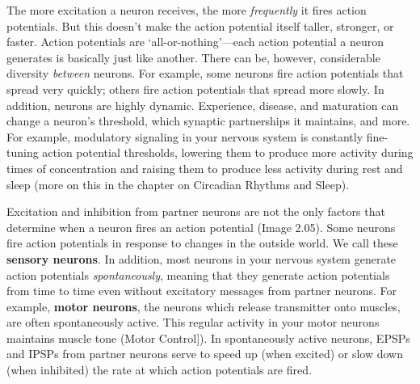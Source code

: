 \documentclass[
]{book}
\begin{document}
The more excitation a neuron receives, the more \emph{frequently} it fires action potentials. But this doesn't make the action potential itself taller, stronger, or faster. Action potentials are `all-or-nothing'---each action potential a neuron generates is basically just like another. There can be, however, considerable diversity \emph{between} neurons. For example, some neurons fire action potentials that spread very quickly; others fire action potentials that spread more slowly. In addition, neurons are highly dynamic. Experience, disease, and maturation can change a neuron's threshold, which synaptic partnerships it maintains, and more. For example, modulatory signaling in your nervous system is constantly fine-tuning action potential thresholds, lowering them to produce more activity during times of concentration and raising them to produce less activity during rest and sleep (more on this in the chapter on Circadian Rhythms and Sleep).

Excitation and inhibition from partner neurons are not the only factors that determine when a neuron fires an action potential (Image 2.05). Some neurons fire action potentials in response to changes in the outside world. We call these \textbf{sensory neurons}. In addition, most neurons in your nervous system generate action potentials \emph{spontaneously}, meaning that they generate action potentials from time to time even without excitatory messages from partner neurons. For example, \textbf{motor neurons}, the neurons which release transmitter onto muscles, are often spontaneously active. This regular activity in your motor neurons maintains muscle tone (Motor Control{]}). In spontaneously active neurons, EPSPs and IPSPs from partner neurons serve to speed up (when excited) or slow down (when inhibited) the rate at which action potentials are fired.
\end{document}
